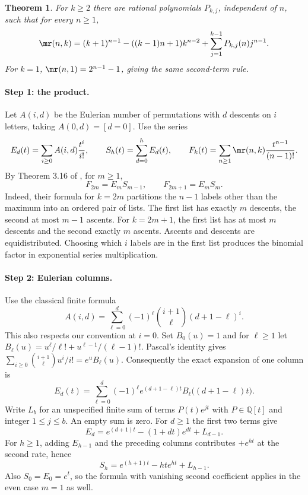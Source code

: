 \documentclass[11pt,a4paper]{article}
\numberwithin{equation}{section}
\newtheorem{theorem}{Theorem}[section]
\theoremstyle{definition}
\theoremstyle{remark}
\begin{document}
\begin{theorem}
For $k\ge2$ there are rational polynomials $P_{k,j}$, independent of $n$,
such that for every $n\ge1$,
\[
 \mr(n,k)=(k+1)^{n-1}-((k-1)n+1)k^{n-2}
       +\sum_{j=1}^{k-1} P_{k,j}(n)j^{n-1}.
\]
For $k=1$, $\mr(n,1)=2^{n-1}-1$, giving the same second-term rule.
\end{theorem}

\paragraph{Step 1: the product.} Let $A(i,d)$ be the Eulerian number of
permutations with $d$ descents on $i$ letters, taking $A(0,d)=[d=0]$.
Use the series
\[
 E_d(t)=\sum_{i\ge0} A(i,d)\frac{t^i}{i!},\qquad
 S_h(t)=\sum_{d=0}^hE_d(t),\qquad
 F_k(t)=\sum_{n\ge1}\mr(n,k)\frac{t^{n-1}}{(n-1)!}.
\]
By Theorem 3.16 of \cite{r32reiwa:ps}, for $m\ge1$,
\[
 F_{2m}=E_mS_{m-1},\qquad F_{2m+1}=E_mS_m .
\]
Indeed, their formula for $k=2m$ partitions the $n-1$ labels other than
the maximum into an ordered pair of lists. The first list has exactly $m$
descents, the second at most $m-1$ ascents. For $k=2m+1$, the first list
has at most $m$ descents and the second exactly $m$ ascents. Ascents and
descents are equidistributed. Choosing which $i$ labels are in the
first list produces the binomial factor in exponential series multiplication.

\paragraph{Step 2: Eulerian columns.} Use the classical finite formula
\[
 A(i,d)=\sum_{\ell=0}^d(-1)^\ell
   \binom{i+1}{\ell}(d+1-\ell)^i .
\]
This also respects our convention at $i=0$. Set $B_0(u)=1$ and for
$\ell\ge1$ let $B_\ell(u)=u^\ell/\ell!+u^{\ell-1}/(\ell-1)!$.
Pascal's identity gives
$\sum_{i\ge0}\binom{i+1}{\ell}u^i/i!=e^u B_\ell(u)$.
Consequently the exact expansion of one column is
\[
 E_d(t)=\sum_{\ell=0}^d(-1)^\ell e^{(d+1-\ell)t}
              B_\ell\big((d+1-\ell)t\big).
\]
Write $L_b$ for an unspecified finite sum of terms $P(t)e^{jt}$
with $P\in\mathbb Q[t]$ and integer $1\le j\le b$. An empty
sum is zero. For $d\ge1$ the first two terms give
\[
 E_d=e^{(d+1)t}-(1+dt)e^{dt}+L_{d-1}.
\]
For $h\ge1$, adding $E_{h-1}$ and the preceding columns contributes
$+e^{ht}$ at the second rate, hence
\[
 S_h=e^{(h+1)t}-ht e^{ht}+L_{h-1}.
\]
Also $S_0=E_0=e^t$, so the formula with vanishing second coefficient
applies in the even case $m=1$ as well.
\end{document}
